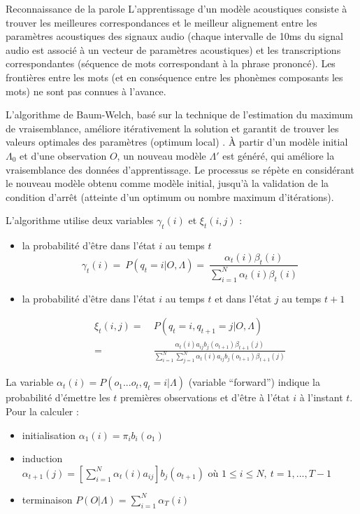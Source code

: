\documentclass{style/these}
\let\oldcite=\cite
\renewcommand{\cite}[1]{{\fontfamily{qcs}\selectfont{\color{darkerblue}[\oldcite{#1}]}}}
\begin{document}
\begin{part}{Reconnaissance de la parole}
L'apprentissage d'un modèle acoustiques consiste à trouver les meilleures correspondances et le meilleur alignement entre les paramètres acoustiques des signaux audio (chaque intervalle de 10ms du signal audio est associé à un vecteur de paramètres acoustiques) et les transcriptions correspondantes (séquence de mots correspondant à la phrase prononcé). Les frontières entre les mots (et en conséquence entre les phonèmes composants les mots) ne sont pas connues à l'avance. 

L'algorithme de Baum-Welch, basé sur la technique de l'estimation du maximum de vraisemblance, améliore itérativement la solution et garantit de trouver les valeurs optimales des paramètres (optimum local) \cite{Baum:1966}. 
À partir d'un modèle initial $\Lambda_0$ et d'une observation $O$, un nouveau modèle $\Lambda'$ est généré, qui améliore la vraisemblance des données d'apprentissage.  
Le processus se répète en considérant le nouveau modèle obtenu comme modèle initial, jusqu'à la validation de la condition d'arrêt (atteinte d'un optimum ou nombre maximum d'itérations). 

L'algorithme utilise deux variables $\gamma_t(i)$ et $\xi_t(i,j)$ :
\begin{itemize}

\item la probabilité d'être dans l'état $i$ au temps $t$ 
		$$\gamma_t(i) =\ P(q_t=i|O, \Lambda) =\ \frac{\alpha_t(i)\beta_{t}(i)}{\sum\limits_{i=1}^{N}\alpha_t(i)\beta_{t}(i)}$$

\item la probabilité d'être dans l'état $i$ au temps $t$ et dans l'état $j$ au temps $t+1$

\begin{equation*}
\begin{split}
		\xi_t(i,j) =\  & P(q_t=i, q_{t+1}=j|O, \Lambda) \\
			   =\  & \frac{\alpha_t(i)a_{ij}b_j(o_{t+1})\beta_{t+1}(j)}{\sum\limits_{i=1}^{N}\sum\limits_{j=1}^{N}\alpha_t(i)a_{ij}b_j(o_{t+1})\beta_{t+1}(j)}
\end{split}
\end{equation*}

\end{itemize}


La variable $\alpha_t(i) = P(o_1...o_t, q_t=i|\Lambda)$ (variable ``forward'') indique la probabilité d'émettre les $t$ premières observations et d'être à l'état $i$ à l'instant $t$. 
Pour la calculer :
\begin{itemize}
\item initialisation $\alpha_1(i)=\pi_ib_i(o_1)$	
\item induction $\alpha_{t+1}(j)=\left [  \sum\limits_{i=1}^{N} \alpha_t(i) a_{ij}\right ] b_j(o_{t+1}) \text{ où } 1 \leq i \leq N,\ t=1,...,T-1$	
\item terminaison $P(O|\Lambda) = \sum\limits_{i=1}^{N}\alpha_T(i)$
\end{itemize}
	


\end{part}
\end{document}
